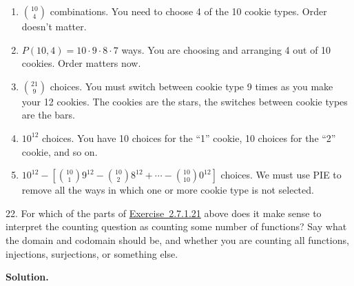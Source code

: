 \documentclass[10pt,]{book}
\theoremstyle{plain}
\theoremstyle{definition}
\theoremstyle{definition}
\theoremstyle{definition}
\numberwithin{equation}{section}
\begin{document}
\begin{exerciselist}
          \leavevmode%
\begin{enumerate}[label=(\alph*)]
\item\hypertarget{li-766}{}\({10 \choose 4}\) combinations. You need to choose 4 of the 10 cookie types. Order doesn't matter.%
\item\hypertarget{li-767}{}\(P(10, 4) = 10 \cdot 9 \cdot 8 \cdot 7\) ways. You are choosing and arranging 4 out of 10 cookies. Order matters now.%
\item\hypertarget{li-768}{}\({21 \choose 9}\) choices. You must switch between cookie type 9 times as you make your 12 cookies. The cookies are the stars, the switches between cookie types are the bars.%
\item\hypertarget{li-769}{}\(10^{12}\) choices. You have 10 choices for the ``1'' cookie, 10 choices for the ``2'' cookie, and so on.%
\item\hypertarget{li-770}{}\(10^{12} - \left[{10 \choose 1}9^{12} - {10 \choose 2}8^{12} + \cdots - {10 \choose 10}0^{12}   \right]\) choices. We must use PIE to remove all the ways in which one or more cookie type is not selected.%
\end{enumerate}

\item[22.]\hypertarget{exercise-123}{}
            For which of the parts of \hyperlink{exr_cookie-counting}{Exercise~2.7.1.21} above does it make sense to interpret the counting question as counting some number of functions? Say what the domain and codomain should be, and whether you are counting all functions, injections, surjections, or something else.
\par\smallskip
\par\smallskip
\noindent\textbf{Solution.}\hypertarget{solution-174}{}\quad


\end{exerciselist}
\end{document}
